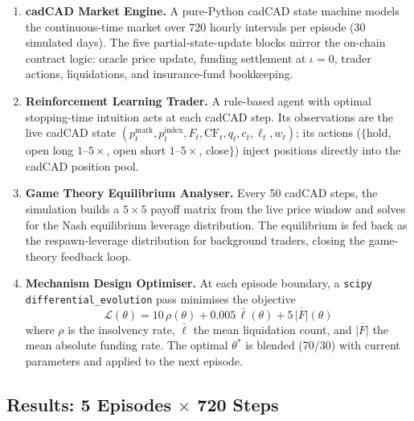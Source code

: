 \documentclass[10pt,twocolumn]{article}
\theoremstyle{plain}
\theoremstyle{definition}
\begin{document}
\begin{enumerate}[leftmargin=*,noitemsep]
\item \textbf{cadCAD Market Engine.} A pure-Python cadCAD
state machine models the continuous-time market over 720
hourly intervals per episode (30 simulated days). The
five partial-state-update blocks mirror the on-chain
contract logic: oracle price update, funding settlement
at $\iota=0$, trader actions, liquidations, and
insurance-fund bookkeeping.

\item \textbf{Reinforcement Learning Trader.} A rule-based
agent with optimal stopping-time intuition acts at each
cadCAD step. Its observations are the live cadCAD state
$(p_t^{\mathrm{mark}},p_t^{\mathrm{index}},F_t,\mathrm{CF}_t,
q_t,c_t,\ell_t,w_t)$; its actions ($\{$hold, open long
$1\text{--}5\times$, open short $1\text{--}5\times$, close$\}$)
inject positions directly into the cadCAD position pool.

\item \textbf{Game Theory Equilibrium Analyser.} Every 50
cadCAD steps, the simulation builds a $5\times5$ payoff
matrix from the live price window and solves for the Nash
equilibrium leverage distribution. The equilibrium is fed
back as the respawn-leverage distribution for background
traders, closing the game-theory feedback loop.

\item \textbf{Mechanism Design Optimiser.} At each episode
boundary, a \texttt{scipy} \texttt{differential\_evolution}
pass minimises the objective
\begin{equation}
\mathcal{L}(\theta) = 10\,\rho(\theta) + 0.005\,\bar\ell(\theta)
                    + 5\,\overline{|F|}(\theta)
\label{eq:md_objective}
\end{equation}
where $\rho$ is the insolvency rate, $\bar\ell$ the mean
liquidation count, and $\overline{|F|}$ the mean absolute
funding rate. The optimal $\theta^*$ is blended (70/30)
with current parameters and applied to the next episode.
\end{enumerate}

\subsection{Results: 5 Episodes $\times$ 720 Steps}
\end{document}

